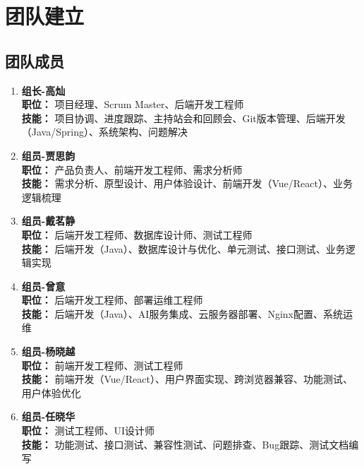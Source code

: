\chapter{团队建立}

\section{团队成员}
\begin{enumerate}
    \item \textbf{组长-高灿} \\
          \textbf{职位：} 项目经理、Scrum Master、后端开发工程师 \\
          \textbf{技能：} 项目协调、进度跟踪、主持站会和回顾会、Git版本管理、后端开发（Java/Spring）、系统架构、问题解决 \\
    \item \textbf{组员-贾思韵} \\
          \textbf{职位：} 产品负责人、前端开发工程师、需求分析师 \\
          \textbf{技能：} 需求分析、原型设计、用户体验设计、前端开发（Vue/React）、业务逻辑梳理 \\
    \item \textbf{组员-戴茗静} \\
          \textbf{职位：} 后端开发工程师、数据库设计师、测试工程师 \\
          \textbf{技能：} 后端开发（Java）、数据库设计与优化、单元测试、接口测试、业务逻辑实现 \\
    \item \textbf{组员-曾意} \\
          \textbf{职位：} 后端开发工程师、部署运维工程师 \\
          \textbf{技能：} 后端开发（Java）、AI服务集成、云服务器部署、Nginx配置、系统运维 \\
    \item \textbf{组员-杨晓越} \\
          \textbf{职位：} 前端开发工程师、测试工程师 \\
          \textbf{技能：} 前端开发（Vue/React）、用户界面实现、跨浏览器兼容、功能测试、用户体验优化 \\
    \item \textbf{组员-任晓华} \\
          \textbf{职位：} 测试工程师、UI设计师 \\
          \textbf{技能：} 功能测试、接口测试、兼容性测试、问题排查、Bug跟踪、测试文档编写 \\
\end{enumerate}


